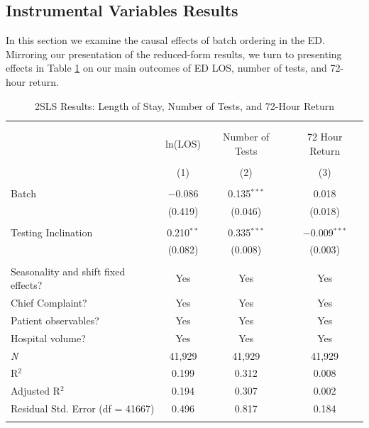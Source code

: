 \documentclass[,,nonblindrev]{informs}
\begin{document}
\hypertarget{instrumental-variables-results}{%
\subsection{Instrumental Variables
Results}\label{instrumental-variables-results}}

In this section we examine the causal effects of batch ordering in the
ED. Mirroring our presentation of the reduced-form results, we turn to
presenting effects in Table \ref{tab:2SLS} on our main outcomes of ED
LOS, number of tests, and 72-hour return.

\begin{table}[!htbp] \centering 
  \caption{2SLS Results: Length of Stay, Number of Tests, and 72-Hour Return} 
  \label{tab:2SLS} 
\begin{tabular}{p{6cm}ccc}
\\[-1.8ex]\hline 
\hline \\[-1.8ex] 
\\[-1.8ex] & ln(LOS) & Number of Tests & 72 Hour Return \\ 
\\[-1.8ex] & (1) & (2) & (3)\\ 
\hline \\[-1.8ex] 
 Batch & $-$0.086 & 0.135$^{***}$ & 0.018 \\ 
  & (0.419) & (0.046) & (0.018) \\ 
  & & & \\ 
 Testing Inclination & 0.210$^{**}$ & 0.335$^{***}$ & $-$0.009$^{***}$ \\ 
  & (0.082) & (0.008) & (0.003) \\ 
  & & & \\ 
Seasonality and shift fixed effects? & Yes & Yes & Yes \\
Chief Complaint? & Yes & Yes & Yes \\
Patient observables? & Yes & Yes & Yes \\
Hospital volume? & Yes & Yes & Yes \\
\midrule
\textit{N} & 41,929 & 41,929 & 41,929 \\ 
R$^{2}$ & 0.199 & 0.312 & 0.008 \\ 
Adjusted R$^{2}$ & 0.194 & 0.307 & 0.002 \\ 
Residual Std. Error (df = 41667) & 0.496 & 0.817 & 0.184 \\ 
\\
\bottomrule
\end{tabular}
\begin{tablenotes}

\end{tablenotes}
\end{table}
\end{document}
